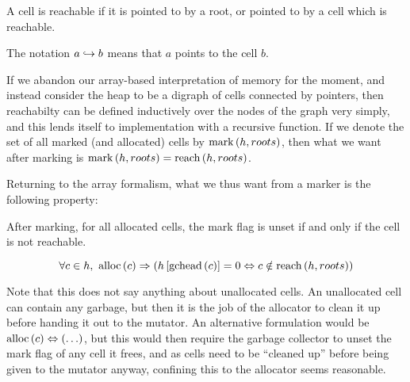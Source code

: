 \begin{definition}[Reachable]
  A cell is reachable if it is pointed to by a root, or pointed to by
  a cell which is reachable.

  \begin{minipage}{.5\textwidth}
    \begin{prooftree}
    \end{prooftree}
  \end{minipage}
  \begin{minipage}{.5\textwidth}
    \begin{prooftree}
    \end{prooftree}
  \end{minipage}

  The notation $a \pointsto b$ means that $a$ points to the cell $b$.
\end{definition}

If we abandon our array-based interpretation of memory for the moment,
and instead consider the \gls{heap} to be a digraph of \glspl{cell}
connected by \glspl{pointer}, then reachabilty can be defined
inductively over the nodes of the graph very simply, and this lends
itself to implementation with a recursive function. If we denote the
set of all marked (and allocated) cells by $\markset{h}{roots}$, then
what we want after marking is $\markset{h}{roots} = \reach{h}{roots}$.

Returning to the array formalism, what we thus want from a marker is
the following property:

\begin{definition}
  After marking, for all allocated \glspl{cell}, the mark flag is
  unset if and only if the \gls{cell} is not reachable.

  \[\forall c \in h,\ \alloc{c} \implies
  \left(h\left[\gchead{c}\right] = 0 \iff c \notin
    \reach{h}{roots}\right)\]
\end{definition}

Note that this does not say anything about unallocated
\glspl{cell}. An unallocated \gls{cell} can contain any garbage, but
then it is the job of the allocator to clean it up before handing it
out to the \gls{mutator}. An alternative formulation would be
$\alloc{c} \iff \left(\ldots\right)$, but this would then require the
\gls{garbage collector} to unset the mark flag of any \gls{cell} it
frees, and as \glspl{cell} need to be ``cleaned up'' before being
given to the \gls{mutator} anyway, confining this to the allocator
seems reasonable.

